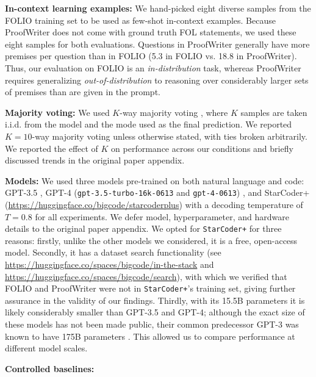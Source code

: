 \textbf{In-context learning examples:} We hand-picked eight diverse samples from the FOLIO training set
to be used as few-shot in-context examples. Because ProofWriter does not come with ground truth
FOL statements, we used these eight samples for both evaluations. Questions in
ProofWriter generally have more premises per question than in FOLIO (5.3 in FOLIO vs. 18.8 in ProofWriter).
Thus, our evaluation on FOLIO is an \emph{in-distribution} task, whereas ProofWriter
requires generalizing \emph{out-of-distribution} to reasoning over considerably larger
sets of premises than are given in the prompt.

\textbf{Majority voting:} We used $K$-way majority voting \cite{wang2023self}, where $K$ samples are taken i.i.d. from the model and the mode used as the final prediction.
We reported $K{=}10$-way majority voting unless otherwise stated, with ties broken arbitrarily.
We reported the effect of $K$ on performance across our conditions and briefly discussed trends in the original paper appendix.

\textbf{Models:}
We used three models pre-trained on both natural language and code: GPT-3.5 \citep{ouyang2022training}, GPT-4 (\texttt{gpt-3.5-turbo-16k-0613} and \texttt{gpt-4-0613}) \citep{openai2023gpt4}, and StarCoder+ (\url{https://huggingface.co/bigcode/starcoderplus}) \citep{li2023starcoder} with a decoding temperature of $T=0.8$ for all experiments. We defer model, hyperparameter, and hardware details to the original paper appendix.
We opted for \texttt{StarCoder+} for three reasons: firstly, unlike the other models we considered, it is a free, open-access model. Secondly, it has a dataset search functionality (see \url{https://huggingface.co/spaces/bigcode/in-the-stack} and \url{https://huggingface.co/spaces/bigcode/search}), with which we verified that FOLIO and ProofWriter were not in \texttt{StarCoder+}'s training set, giving further assurance in the validity of our findings. Thirdly, with its 15.5B parameters it is likely considerably smaller than GPT-3.5 and GPT-4; although the exact size of these models has not been made public, their common predecessor GPT-3 was known to have 175B parameters \citep{brown2020language}. This allowed us to compare performance at different model scales.

\textbf{Controlled baselines:}

